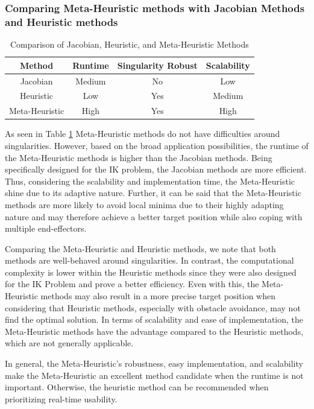 \documentclass[conference]{IEEEtran}
\begin{document}
\subsubsection{Comparing Meta-Heuristic methods with Jacobian Methods and Heuristic methods}\label{Comparing All Section}
\begin{table}[ht]
\centering
\caption{Comparison of Jacobian, Heuristic, and Meta-Heuristic Methods}\label{Comparing all table}
\begin{tabular}{|c|c|c|c|}
\hline
\textbf{Method} & \textbf{Runtime} & \textbf{Singularity Robust} & \textbf{Scalability}\\
\hline
Jacobian & Medium & No & Low  \\
Heuristic & Low & Yes & Medium \\
Meta-Heuristic & High & Yes & High \\
\hline
\end{tabular}
\end{table}

As seen in Table \ref{Comparing all table} Meta-Heuristic methods do not have difficulties around singularities. However, based on the broad application possibilities, the runtime of the Meta-Heuristic methods is higher than the Jacobian methods. Being specifically designed for the IK problem, the Jacobian methods are more efficient. Thus, considering the scalability and implementation time, the Meta-Heuristic shine due to its adaptive nature. Further, it can be said that the Meta-Heuristic methods are more likely to avoid local minima due to their highly adapting nature and may therefore achieve a better target position while also coping with multiple end-effectors.

Comparing the Meta-Heuristic and Heuristic methods, we note that both methods are well-behaved around singularities. In contrast, the computational complexity is lower within the Heuristic methods since they were also designed for the IK Problem and prove a better efficiency. Even with this, the Meta-Heuristic methods may also result in a more precise target position when considering that Heuristic methods, especially with obstacle avoidance, may not find the optimal solution. In terms of scalability and ease of implementation, the Meta-Heuristic methods have the advantage compared to the Heuristic methods, which are not generally applicable.

In general, the Meta-Heuristic's robustness, easy implementation, and scalability make the Meta-Heuristic an excellent method candidate when the runtime is not important. Otherwise, the heuristic method can be recommended when prioritizing real-time usability.
\end{document}
